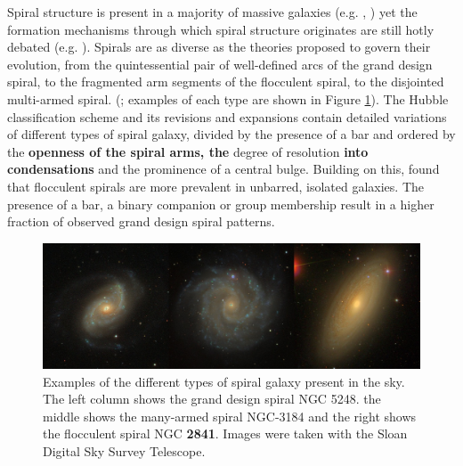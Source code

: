 
Spiral structure is present in a majority of massive galaxies (e.g. \citealt{1989gadv.book..151B}, \citealt{2008MNRAS.389.1179L}) yet the formation mechanisms through which spiral structure originates are still hotly debated (e.g. \citealt{2014PASA...31...35D}). Spirals are as diverse as the theories proposed to govern their evolution, from the quintessential pair of well-defined arcs of the grand design spiral, to the fragmented arm segments of the flocculent spiral, to the disjointed multi-armed spiral.
(\citealt{2011ApJ...737...32E}; examples of each type are shown in Figure \ref{fig:spiral-galaxy-types}). The Hubble classification scheme \citep{1926ApJ....64..321H} and its revisions and expansions \citep{1961hag..book.....S,1991rc3..book.....D} contain detailed variations of different types of spiral galaxy, divided by the presence of a bar and ordered by the \textbf{openness of the spiral arms, the} degree of resolution \textbf{into condensations} and the prominence of a central bulge. Building on this, \citet{1982MNRAS.201.1021E} found that flocculent spirals are more prevalent in unbarred, isolated galaxies. The presence of a bar, a binary companion or group membership result in a higher fraction of observed grand design spiral patterns.

\begin{figure}
  \includegraphics[width=15cm]{plots/galaxy_types_remade.jpg}
  \caption{Examples of the different types of spiral galaxy present in the sky. The left column shows the grand design spiral NGC 5248. the middle shows the many-armed spiral NGC-3184 and the right shows the flocculent spiral NGC {\bf 2841}. Images were taken with the Sloan Digital Sky Survey Telescope.}
  \label{fig:spiral-galaxy-types}
\end{figure}

